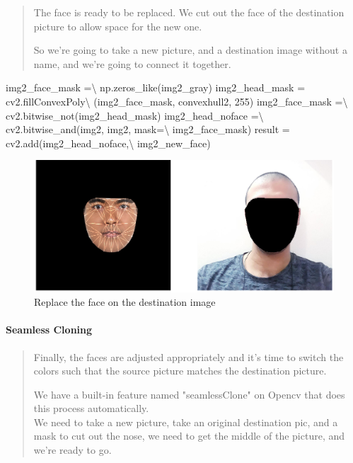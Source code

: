 \documentclass[12pt, a4paper, twocolumn]{article}
\newenvironment{Shaded}{}{}
\newcommand{\DecValTok}[1]{\textcolor[rgb]{0.25,0.63,0.44}{#1}}
\newcommand{\OperatorTok}[1]{\textcolor[rgb]{0.40,0.40,0.40}{#1}}
\newcommand{\NormalTok}[1]{#1}
\let\oldparagraph\paragraph
\renewcommand{\paragraph}[1]{\oldparagraph{#1}\mbox{}}
\begin{document}
\begin{quote}
	The face is ready to be replaced. We cut out the face of the destination
	picture to allow space for the new one.
	
	So we're going to take a new picture, and a destination image without a
	name, and we're going to connect it together.
\end{quote}

\begin{Shaded}
\small
\begin{Highlighting}[]
\NormalTok{img2_face_mask }\OperatorTok{=}\OperatorTok{\textbackslash{}}
\NormalTok{}\NormalTok{ np.zeros_like(img2_gray)}
\NormalTok{img2_head_mask }\OperatorTok{=}\NormalTok{ cv2.fillConvexPoly}\OperatorTok{\textbackslash{}}
\NormalTok{(img2_face_mask, convexhull2, }\DecValTok{255}\NormalTok{)}
\NormalTok{img2_face_mask }\OperatorTok{=}\OperatorTok{\textbackslash{}}
\NormalTok{}\NormalTok{ cv2.bitwise_not(img2_head_mask)}
\NormalTok{img2_head_noface }\OperatorTok{=}\OperatorTok{\textbackslash{}}
\NormalTok{}\NormalTok{ cv2.bitwise_and(img2, img2, mask}\OperatorTok{=}\OperatorTok{\textbackslash{}}
\NormalTok{}\NormalTok{img2_face_mask)}
\NormalTok{result }\OperatorTok{=}\NormalTok{ cv2.add(img2_head_noface,}\OperatorTok{\textbackslash{}}
\NormalTok{ img2_new_face)}
\end{Highlighting}
\end{Shaded}

\begin{figure}
	\centering
	\includegraphics{meta/output_37_0.png}
	\caption{Replace the face on the destination image}
\end{figure}

\paragraph{Seamless Cloning}\label{header-n169}

\begin{quote}
	Finally, the faces are adjusted appropriately and it's time to switch
	the colors such that the source picture matches the destination picture.
	
	We have a built-in feature named "seamlessClone" on Opencv that does
	this process automatically.\\
	We need to take a new picture, take an original destination pic, and a
	mask to cut out the nose, we need to get the middle of the picture, and
	we're ready to go.
\end{quote}
\end{document}

